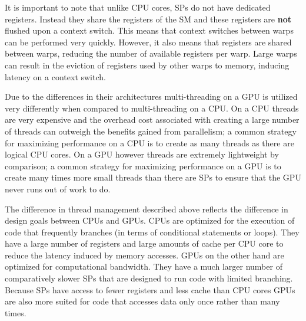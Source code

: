 It is important to note that unlike CPU cores, SPs do not have dedicated registers.
Instead they share the registers of the SM and these registers are \textbf{not} flushed upon a context switch.
This means that context switches between warps can be performed very quickly.
However, it also means that registers are shared between warps, reducing the number of available registers per warp.
Large warps can result in the eviction of registers used by other warps to memory, inducing latency on a context switch.

Due to the differences in their architectures multi-threading on a GPU
is utilized very differently when compared to multi-threading on a CPU.
On a CPU threads are very expensive and the overhead cost associated with
creating a large number of threads can outweigh the benefits gained from parallelism;
a common strategy for maximizing performance on a CPU is to create as many threads as there are logical CPU cores.
On a GPU however threads are extremely lightweight by comparison;
a common strategy for maximizing performance on a GPU is to create
many times more small threads than there are SPs to ensure that the GPU never runs out of work to do.

The difference in thread management described above reflects the difference in design goals between CPUs and GPUs.
CPUs are optimized for the execution of code that frequently branches (in terms of conditional statements or loops).
They have a large number of registers and large amounts of cache per CPU core to reduce the latency induced by memory accesses.
GPUs on the other hand are optimized for computational bandwidth.
They have a much larger number of comparatively slower SPs that are designed to run code with limited branching.
Because SPs have access to fewer registers and less cache than CPU cores GPUs are also more suited for code that
accesses data only once rather than many times.
